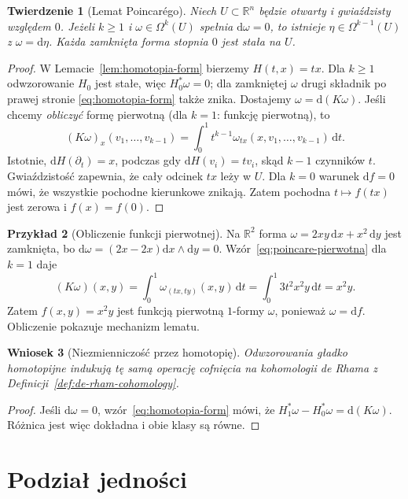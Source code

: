 \documentclass[11pt,a4paper,oneside]{report}
\newcommand{\R}{\mathbb{R}}
\newcommand{\dd}{\mathrm d}
\theoremstyle{plain}
\newtheorem{twierdzenie}{Twierdzenie}[section]
\newtheorem{wniosek}[twierdzenie]{Wniosek}
\theoremstyle{definition}
\newtheorem{przyklad}[twierdzenie]{Przykład}
\theoremstyle{remark}
\begin{document}
\begin{twierdzenie}[Lemat Poincarégo]
\label{thm:lemat-poincare-formy}
Niech $U\subset\R^n$ będzie otwarty i gwiaździsty
względem $0$. Jeżeli $k\geq1$ i
$\omega\in\Omega^k(U)$ spełnia $\dd\omega=0$,
to istnieje $\eta\in\Omega^{k-1}(U)$ z
$\omega=\dd\eta$. Każda zamknięta forma stopnia
$0$ jest stała na $U$.
\end{twierdzenie}
\begin{proof}
W Lemacie~\ref{lem:homotopia-form} bierzemy
$H(t,x)=tx$. Dla $k\geq1$ odwzorowanie $H_0$
jest stałe, więc $H_0^*\omega=0$; dla zamkniętej
$\omega$ drugi składnik po prawej stronie
\eqref{eq:homotopia-form} także znika.
Dostajemy $\omega=\dd(K\omega)$.
Jeśli chcemy \emph{obliczyć} formę pierwotną
(dla $k=1$: funkcję pierwotną), to
\begin{equation}\label{eq:poincare-pierwotna}
 (K\omega)_x(v_1,\ldots,v_{k-1})
 =\int_0^1 t^{k-1}
   \omega_{tx}(x,v_1,\ldots,v_{k-1})\,\dd t.
\end{equation}
Istotnie, $\dd H(\partial_t)=x$, podczas gdy
$\dd H(v_i)=tv_i$, skąd $k-1$ czynników $t$.
Gwiaździstość zapewnia, że cały odcinek $tx$ leży w $U$.
Dla $k=0$ warunek $\dd f=0$ mówi, że wszystkie
pochodne kierunkowe znikają. Zatem pochodna
$t\mapsto f(tx)$ jest zerowa i $f(x)=f(0)$.
\end{proof}

\begin{przyklad}[Obliczenie funkcji pierwotnej]
Na $\R^2$ forma $\omega=2xy\,\dd x+x^2\,\dd y$
jest zamknięta, bo
$\dd\omega=(2x-2x)\dd x\wedge\dd y=0$.
Wzór~\eqref{eq:poincare-pierwotna} dla $k=1$ daje
\[
 (K\omega)(x,y)=\int_0^1
 \omega_{(tx,ty)}(x,y)\,\dd t
 =\int_0^1 3t^2x^2y\,\dd t=x^2y.
\]
Zatem $f(x,y)=x^2y$ jest funkcją pierwotną
$1$-formy $\omega$, ponieważ $\omega=\dd f$.
Obliczenie pokazuje mechanizm lematu.
\end{przyklad}

\begin{wniosek}[Niezmienniczość przez homotopię]
\label{cor:de-rham-homotopia}
Odwzorowania gładko homotopijne indukują tę samą
operację cofnięcia na kohomologii de Rhama
z Definicji~\ref{def:de-rham-cohomology}.
\end{wniosek}
\begin{proof}
Jeśli $\dd\omega=0$, wzór~\eqref{eq:homotopia-form}
mówi, że $H_1^*\omega-H_0^*\omega=\dd(K\omega)$.
Różnica jest więc dokładna i obie klasy są równe.
\end{proof}

\section{Podział jedności}
\label{sec:formy-podzial-jednosci}
\end{document}
